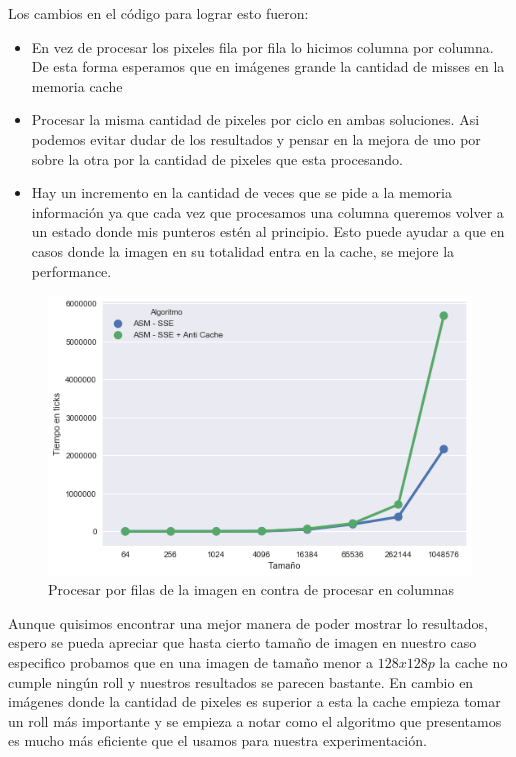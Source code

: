 Los cambios en el código para lograr esto fueron:
\begin{itemize}
\item En vez de procesar los pixeles fila por fila lo hicimos columna por columna. De esta forma esperamos que en imágenes grande la cantidad de misses en la memoria cache 

\item Procesar la misma cantidad de pixeles por ciclo en ambas soluciones. Asi podemos evitar dudar de los resultados y pensar en la mejora de uno por sobre la otra por la cantidad de pixeles que esta procesando.

\item Hay un incremento en la cantidad de veces que se pide a la memoria información ya que cada vez que procesamos una columna queremos volver a un estado donde mis punteros estén al principio. Esto puede ayudar a que en casos donde la imagen en su totalidad entra en la cache, se mejore la performance. 
\end{itemize}
\begin{figure}[H]
	\centering
	\includegraphics[scale=0.5]{img/fourCombine_antiCache.png}
	\caption{Procesar por filas de la imagen en contra de procesar en columnas}
	\label{fourCombine_antiCache}
\end{figure}

Aunque quisimos encontrar una mejor manera de poder mostrar lo resultados, espero se pueda apreciar que hasta cierto tamaño de imagen en nuestro caso especifico probamos que en una imagen de tamaño menor a  $128x128p$ la cache no cumple ningún roll y nuestros resultados se parecen bastante. En cambio en imágenes donde la cantidad de pixeles es superior a esta la cache empieza tomar un roll más importante y se empieza a notar como el algoritmo que presentamos es mucho más eficiente que el usamos para nuestra experimentación.

